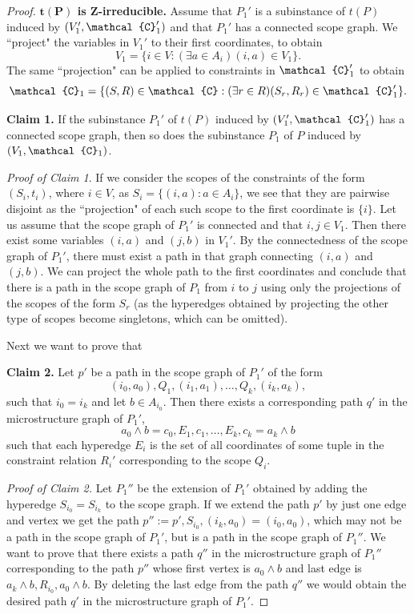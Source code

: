 \documentclass[11pt]{amsart}
\newcommand{\vr}[1]{{\uppercase {\mathcal{#1}}}}
\newcommand{\mt}{\wedge}
\theoremstyle{definition}
\begin{document}
\begin{proof}
{\bf $\mathbf{t(P)}$ is Z-irreducible.} Assume that $P_1'$ is a subinstance of $t(P)$ induced by $(V_1',\vr c_1')$ and that $P_1'$ has a connected scope graph. We ``project" the variables in $V_1'$ to their first coordinates, to obtain 
\[V_1=\{i\in V:(\exists a\in A_i)(i,a)\in V_1\}.\] 
The same ``projection" can be applied to constraints in $\vr c_1'$ to obtain
\[\vr c_1=\{(S,R)\in \vr c:(\exists r\in R)(S_r,R_r)\in \vr c_1'\}.\]

{\bf Claim 1.} If the subinstance $P_1'$ of $t(P)$ induced by $(V_1',\vr c_1')$ has a connected scope graph, then so does the subinstance $P_1$ of $P$ induced by $(V_1,\vr c_1)$. 

{\em Proof of Claim 1}. If we consider the scopes of the constraints of the form $(S_i,t_i)$, where $i\in V$, as $S_i=\{(i,a):a\in A_i\}$, we see that they are pairwise disjoint as the ``projection" of each such scope to the first coordinate is $\{i\}$. Let us assume that the scope graph of $P_1'$ is connected and that $i,j\in V_1$. Then there exist some variables $(i,a)$ and $(j,b)$ in $V_1'$. By the connectedness of the scope graph of $P_1'$, there must exist a path in that graph connecting $(i,a)$ and $(j,b)$. We can project the whole path to the first coordinates and conclude that there is a path in the scope graph of $P_1$ from $i$ to $j$ using only the projections of the scopes of the form $S_r$ (as the hyperedges obtained by projecting the other type of scopes become singletons, which can be omitted).

Next we want to prove that

{\bf Claim 2.} Let $p'$ be a path in the scope graph of $P_1'$ of the form
\[(i_0,a_0),Q_1,(i_1,a_1),\dots,Q_k,(i_k,a_k),\]
such that $i_0=i_k$ and let $b\in A_{i_0}$. Then there exists a corresponding path $q'$ in the microstructure graph of $P_1'$,
\[a_0\mt b=c_0,E_1,c_1,\dots,E_k,c_k=a_k\mt b\]
such that each hyperedge $E_i$ is the set of all coordinates of some tuple in the constraint relation $R_i'$ corresponding to the scope $Q_i$.

{\em Proof of Claim 2.} Let $P_1''$ be the extension of $P_1'$ obtained by adding the hyperedge $S_{i_0}=S_{i_k}$ to the scope graph. If we extend the path $p'$ by just one edge and vertex we get the path $p'':=p',S_{i_0},(i_k,a_0)=(i_0,a_0)$, which may not be a path in the scope graph of $P_1'$, but is a path in the scope graph of $P_1''$. We want to prove that there exists a path $q''$ in the microstructure graph of $P_1''$ corresponding to the path $p''$ whose first vertex is $a_0\mt b$ and last edge is $a_k\mt b, R_{i_0}, a_0\mt b$. By deleting the last edge from the path $q''$ we would obtain the desired path $q'$ in the microstructure graph of $P_1'$.


\end{proof}
\end{document}
